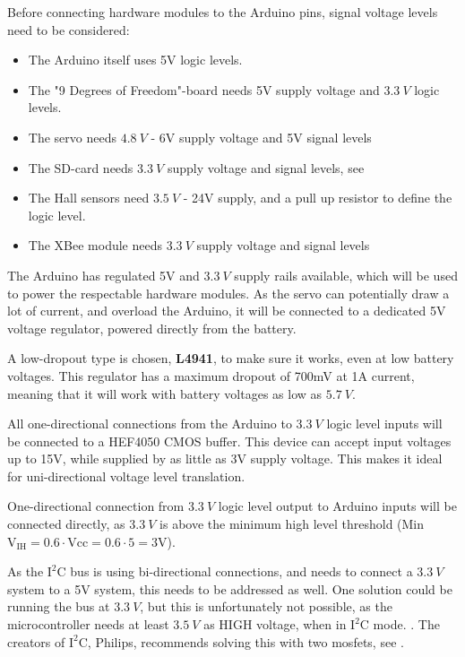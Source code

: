 Before connecting hardware modules to the Arduino pins, signal voltage levels need to be considered:

\begin{itemize}
\item The Arduino itself uses 5V logic levels.\cite{MegaInfo}
\item The "9 Degrees of Freedom"-board needs 5V supply voltage and $\SI{3,3}{V}$ logic levels. 
\item The servo needs $\SI{4,8}{V}$ - 6V supply voltage and 5V signal levels
\item The SD-card needs $\SI{3,3}{V}$ supply voltage and signal levels, see 
\item The Hall sensors need $\SI{3,5}{V}$ - 24V supply, and a pull up resistor to define the logic level.
\item The XBee module needs $\SI{3,3}{V}$ supply voltage and signal levels
\end{itemize} 

The Arduino has regulated 5V and $\SI{3,3}{V}$ supply rails available, which will be used to power the respectable hardware modules. As the servo can potentially draw a lot of current, and overload the Arduino, it will be connected to a dedicated 5V voltage regulator, powered directly from the battery.

A low-dropout type is chosen, \textbf{L4941}, to make sure it works, even at low battery voltages. This regulator has a maximum dropout of 700mV at 1A current, meaning that it will work with battery voltages as low as $\SI{5,7}{V}$.  

All one-directional connections from the Arduino to  $\SI{3,3}{V}$ logic level inputs will be connected to a HEF4050 CMOS buffer. This device can accept input voltages up to 15V, while supplied by as little as 3V supply voltage. This makes it ideal for uni-directional voltage level translation. 

One-directional connection from  $\SI{3,3}{V}$ logic level output to Arduino inputs will be connected directly, as $\SI{3,3}{V}$ is above the minimum high level threshold (Min $\text{V}_\text{IH}=\SI{0,6}\cdot \text{Vcc} = \SI{0,6}\cdot 5 = 3$V). \cite{Atmega}

As the $\text{I}^2\text{C}$ bus is using bi-directional connections, and needs to connect a $\SI{3,3}{V}$ system to a 5V system, this needs to be addressed as well. One solution could be running the bus at $\SI{3,3}{V}$, but this is unfortunately not possible, as the microcontroller needs at least $\SI{3,5}{V}$ as HIGH voltage, when in  $\text{I}^2\text{C}$ mode. \cite{Atmega}. The creators of $\text{I}^2\text{C}$, Philips, recommends solving this with two mosfets, see .

